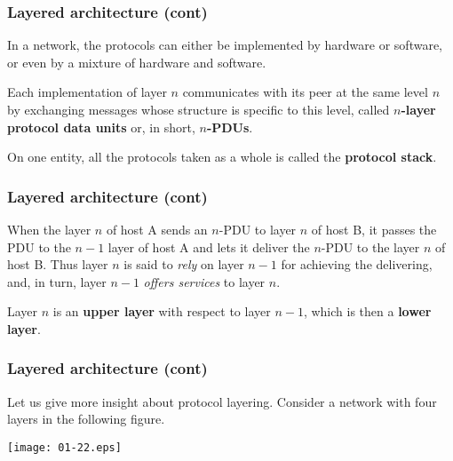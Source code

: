 %
\begin{frame}
\frametitle{Layered architecture (cont)}

In a network, the protocols can either be implemented by hardware or
software, or even by a mixture of hardware and software.

\bigskip

Each implementation of layer \(n\) communicates with its peer at the
same level \(n\) by exchanging messages whose structure is specific to
this level, called \textbf{\(n\)-layer protocol data units} or, in
short, \textbf{\(n\)-PDUs}.

\bigskip

On one entity, all the protocols taken as a whole is called the
\textbf{protocol stack}.

\end{frame}


%
\begin{frame}
\frametitle{Layered architecture (cont)}

When the layer \(n\) of host A sends an \(n\)-PDU to layer \(n\) of
host B, it passes the PDU to the \(n-1\) layer of host A and lets it
deliver the \(n\)-PDU to the layer \(n\) of host B. Thus layer \(n\)
is said to \emph{rely} on layer \(n-1\) for achieving the delivering,
and, in turn, layer \(n-1\) \emph{offers services} to layer \(n\).

\bigskip

Layer \(n\) is an \textbf{upper layer} with respect to layer \(n-1\),
which is then a \textbf{lower layer}.

\end{frame}

%
\begin{frame}
\frametitle{Layered architecture (cont)}

Let us give more insight about protocol layering. Consider a network
with four layers in the following figure.
\begin{center}
\texttt{[image: 01-22.eps]}
\end{center}

\end{frame}

